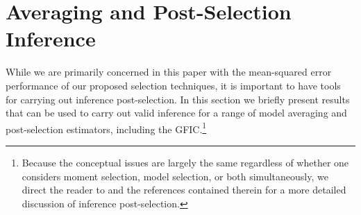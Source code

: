 \section{Averaging and Post-Selection Inference}
\label{sec:avg}

While we are primarily concerned in this paper with the mean-squared error performance of our proposed selection techniques, it is important to have tools for carrying out  inference post-selection.
In this section we briefly present results that can be used to carry out valid inference for a range of model averaging and post-selection estimators, including the GFIC.\footnote{Because the conceptual issues are largely the same regardless of whether one considers moment selection, model selection, or both simultaneously, we direct the reader to \cite{DiTraglia2016} and the references contained therein for a more detailed discussion of inference post-selection.}

